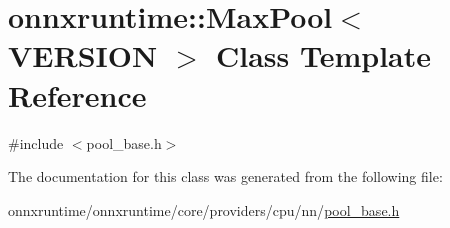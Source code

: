 \hypertarget{classonnxruntime_1_1MaxPool}{}\section{onnxruntime\+:\+:Max\+Pool$<$ V\+E\+R\+S\+I\+ON $>$ Class Template Reference}
\label{classonnxruntime_1_1MaxPool}


{\ttfamily \#include $<$pool\+\_\+base.\+h$>$}



The documentation for this class was generated from the following file\+:\begin{DoxyCompactItemize}
\item 
onnxruntime/onnxruntime/core/providers/cpu/nn/\mbox{\hyperlink{pool__base_8h}{pool\+\_\+base.\+h}}\end{DoxyCompactItemize}
